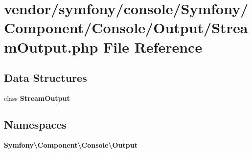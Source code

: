 \section{vendor/symfony/console/\+Symfony/\+Component/\+Console/\+Output/\+Stream\+Output.php File Reference}
\label{_stream_output_8php}
\subsection*{Data Structures}
\begin{DoxyCompactItemize}
\item 
class {\bf Stream\+Output}
\end{DoxyCompactItemize}
\subsection*{Namespaces}
\begin{DoxyCompactItemize}
\item 
 {\bf Symfony\textbackslash{}\+Component\textbackslash{}\+Console\textbackslash{}\+Output}
\end{DoxyCompactItemize}
